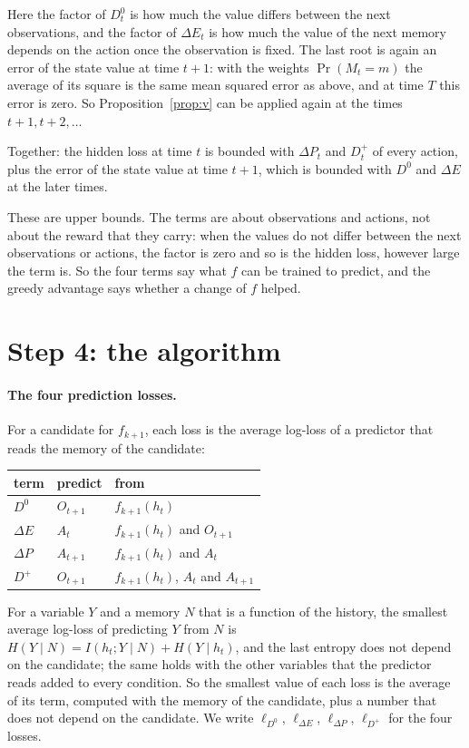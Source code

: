 \documentclass[11pt]{article}
\theoremstyle{definition}
\newcommand{\dE}{\Delta E}
\newcommand{\dP}{\Delta P}
\begin{document}
Here the factor of $D^0_t$ is how much the value differs between the next observations, and the factor of $\dE_t$ is how much the value of the next memory depends on the action once the observation is fixed. The last root is again an error of the state value at time $t+1$: with the weights $\Pr(M_t=m)$ the average of its square is the same mean squared error as above, and at time $T$ this error is zero. So Proposition~\ref{prop:v} can be applied again at the times $t+1,t+2,\dots$

Together: the hidden loss at time $t$ is bounded with $\dP_t$ and $D^+_t$ of every action, plus the error of the state value at time $t+1$, which is bounded with $D^0$ and $\dE$ at the later times.

These are upper bounds. The terms are about observations and actions, not about the reward that they carry: when the values do not differ between the next observations or actions, the factor is zero and so is the hidden loss, however large the term is. So the four terms say what $f$ can be trained to predict, and the greedy advantage says whether a change of $f$ helped.

\section{Step 4: the algorithm}\label{sec:algo}

\paragraph{The four prediction losses.} For a candidate for $f_{k+1}$, each loss is the average log-loss of a predictor that reads the memory of the candidate:
\begin{center}
\small
\begin{tabular}{lll}
\hline
term & predict & from\\
\hline
$D^0$ & $O_{t+1}$ & $f_{k+1}(h_t)$\\
$\dE$ & $A_t$ & $f_{k+1}(h_t)$ and $O_{t+1}$\\
$\dP$ & $A_{t+1}$ & $f_{k+1}(h_t)$ and $A_t$\\
$D^+$ & $O_{t+1}$ & $f_{k+1}(h_t)$, $A_t$ and $A_{t+1}$\\
\hline
\end{tabular}
\end{center}
For a variable $Y$ and a memory $N$ that is a function of the history, the smallest average log-loss of predicting $Y$ from $N$ is $H(Y\mid N)=I(h_t;Y\mid N)+H(Y\mid h_t)$, and the last entropy does not depend on the candidate; the same holds with the other variables that the predictor reads added to every condition. So the smallest value of each loss is the average of its term, computed with the memory of the candidate, plus a number that does not depend on the candidate. We write $\ell_{D^0}$, $\ell_{\dE}$, $\ell_{\dP}$, $\ell_{D^+}$ for the four losses.
\end{document}
